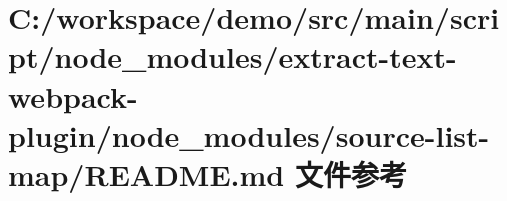 \hypertarget{node__modules_2extract-text-webpack-plugin_2node__modules_2source-list-map_2_r_e_a_d_m_e_8md}{}\section{C\+:/workspace/demo/src/main/script/node\+\_\+modules/extract-\/text-\/webpack-\/plugin/node\+\_\+modules/source-\/list-\/map/\+R\+E\+A\+D\+ME.md 文件参考}
\label{node__modules_2extract-text-webpack-plugin_2node__modules_2source-list-map_2_r_e_a_d_m_e_8md}
